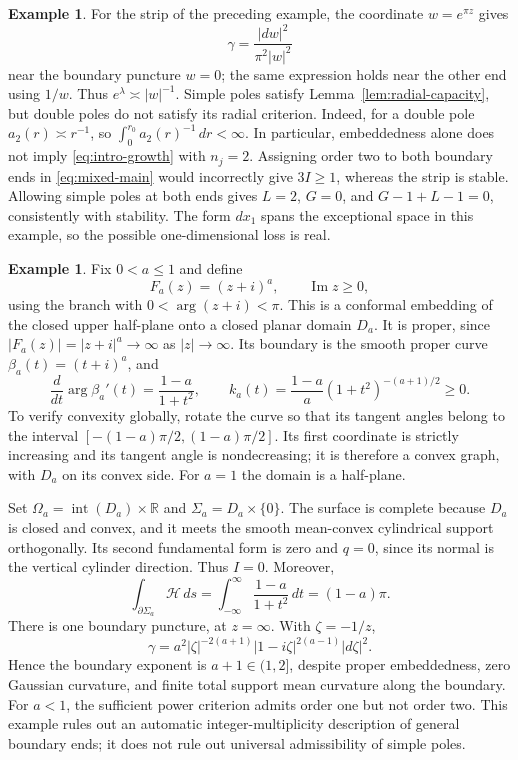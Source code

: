 \documentclass[11pt]{amsart}
\numberwithin{equation}{section}
\theoremstyle{definition}
\newtheorem{example}[theorem]{Example}
\theoremstyle{remark}
\newcommand{\R}{\mathbb R}
\begin{document}
\begin{example}\label{ex:strip-poles}
For the strip of the preceding example, the coordinate $w=e^{\pi z}$ gives
\[
\gamma=\frac{|dw|^2}{\pi^2|w|^2}
\]
near the boundary puncture $w=0$; the same expression holds near the other end using $1/w$. Thus $e^\lambda\asymp|w|^{-1}$. Simple poles satisfy Lemma~\ref{lem:radial-capacity}, but double poles do not satisfy its radial criterion. Indeed, for a double pole $a_2(r)\asymp r^{-1}$, so $\int_0^{r_0}a_2(r)^{-1}\,dr<\infty$. In particular, embeddedness alone does not imply \eqref{eq:intro-growth} with $n_j=2$. Assigning order two to both boundary ends in \eqref{eq:mixed-main} would incorrectly give $3I\ge1$, whereas the strip is stable. Allowing simple poles at both ends gives $L=2$, $G=0$, and $G-1+L-1=0$, consistently with stability. The form $dx_1$ spans the exceptional space in this example, so the possible one-dimensional loss is real.
\end{example}

\begin{example}\label{ex:fractional}
Fix $0<a\le1$ and define
\[
F_a(z)=(z+i)^a,\qquad \operatorname{Im}z\ge0,
\]
using the branch with $0<\arg(z+i)<\pi$. This is a conformal embedding of the closed upper half-plane onto a closed planar domain $D_a$. It is proper, since $|F_a(z)|=|z+i|^a\to\infty$ as $|z|\to\infty$. Its boundary is the smooth proper curve $\beta_a(t)=(t+i)^a$, and
\[
\frac{d}{dt}\arg\beta_a'(t)=\frac{1-a}{1+t^2},
\qquad
k_a(t)=\frac{1-a}{a}(1+t^2)^{-(a+1)/2}\ge0.
\]
To verify convexity globally, rotate the curve so that its tangent angles belong to the interval $[-(1-a)\pi/2,(1-a)\pi/2]$. Its first coordinate is strictly increasing and its tangent angle is nondecreasing; it is therefore a convex graph, with $D_a$ on its convex side. For $a=1$ the domain is a half-plane.

Set $\Omega_a=\operatorname{int}(D_a)\times\R$ and $\Sigma_a=D_a\times\{0\}$. The surface is complete because $D_a$ is closed and convex, and it meets the smooth mean-convex cylindrical support orthogonally. Its second fundamental form is zero and $q=0$, since its normal is the vertical cylinder direction. Thus $I=0$. Moreover,
\[
\int_{\partial\Sigma_a}\mathscr H\,ds
=\int_{-\infty}^{\infty}\frac{1-a}{1+t^2}\,dt
=(1-a)\pi.
\]
There is one boundary puncture, at $z=\infty$. With $\zeta=-1/z$,
\[
\gamma=a^2|\zeta|^{-2(a+1)}|1-i\zeta|^{2(a-1)}|d\zeta|^2.
\]
Hence the boundary exponent is $a+1\in(1,2]$, despite proper embeddedness, zero Gaussian curvature, and finite total support mean curvature along the boundary. For $a<1$, the sufficient power criterion admits order one but not order two. This example rules out an automatic integer-multiplicity description of general boundary ends; it does not rule out universal admissibility of simple poles.
\end{example}
\end{document}
